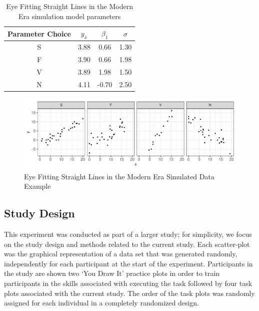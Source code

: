 \documentclass[12pt]{article}
\begin{document}
\begin{table}

\caption{\label{tab:eyefitting-parameters}Eye Fitting Straight Lines in the Modern Era simulation model parameters}
\centering
\begin{tabular}[t]{cccc}
\toprule
Parameter Choice & $y_{\bar{x}}$ & $\beta_1$ & $\sigma$\\
\midrule
S & 3.88 & 0.66 & 1.30\\
F & 3.90 & 0.66 & 1.98\\
V & 3.89 & 1.98 & 1.50\\
N & 4.11 & -0.70 & 2.50\\
\bottomrule
\end{tabular}
\end{table}

\begin{figure}[tbp]

{\centering \includegraphics[width=1\linewidth,]{Eye-Fitting-Straight-Lines-in-the-Modern-Era_files/figure-latex/eyefitting-simplot-1} 

}

\caption{Eye Fitting Straight Lines in the Modern Era Simulated Data Example}\label{fig:eyefitting-simplot}
\end{figure}

\hypertarget{study-design}{%
\subsection{Study Design}\label{study-design}}

This experiment was conducted as part of a larger study; for simplicity,
we focus on the study design and methods related to the current study.
Each scatter-plot was the graphical representation of a data set that
was generated randomly, independently for each participant at the start
of the experiment. Participants in the study are shown two `You Draw It'
practice plots in order to train participants in the skills associated
with executing the task followed by four task plots associated with the
current study. The order of the task plots was randomly assigned for
each individual in a completely randomized design.
\end{document}
